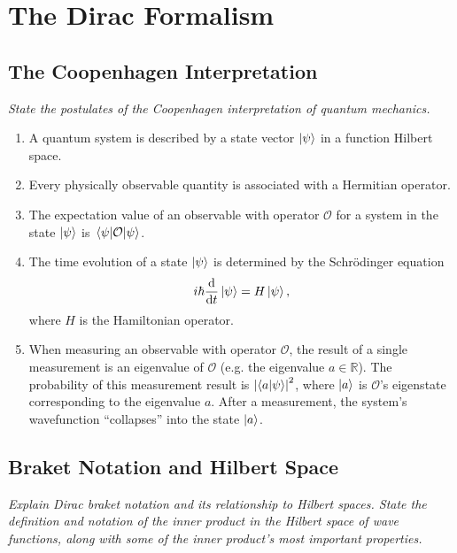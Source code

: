 \documentclass[11pt, a4paper]{article}
\newcommand{\Schro}{Schr\"{o}dinger\xspace}
\renewcommand{\O}{\mathcal{O}}  %
\begin{document}
\newpage

\section{The Dirac Formalism}

\subsection{The Coopenhagen Interpretation}
\textit{State the postulates of the Coopenhagen interpretation of quantum mechanics.}
\begin{enumerate}
	\item A quantum system is described by a state vector $ \ket{\psi} $ in a function Hilbert space.
	
	\item Every physically observable quantity is associated with a Hermitian operator.
	
	\item The expectation value of an observable with operator $ \O $ for a system in the state $ \ket{\psi} $ is $ \mel{\psi}{\O}{\psi} $.
	
	\item The time evolution of a state $ \ket{\psi} $ is determined by the \Schro equation
	\begin{equation*}
		i \hbar \dv{t} \ket{\psi} = H \ket{\psi},
	\end{equation*}
	where $ H $ is the Hamiltonian operator.
	
	\item When measuring an observable with operator $ \O $, the result of a single measurement is an eigenvalue of $ \O $ (e.g. the eigenvalue $ a \in \mathbb{R} $). The probability of this measurement result is $ \abs{\braket{a}{\psi}}^{2} $, where $ \ket{a} $ is $ \O $'s eigenstate corresponding to the eigenvalue $ a $. After a measurement, the system's wavefunction ``collapses'' into the state $ \ket{a} $.
\end{enumerate}

\subsection{Braket Notation and Hilbert Space}
\textit{Explain Dirac braket notation and its relationship to Hilbert spaces. State the definition and notation of the inner product in the Hilbert space of wave functions, along with some of the inner product's most important properties.}
\end{document}
